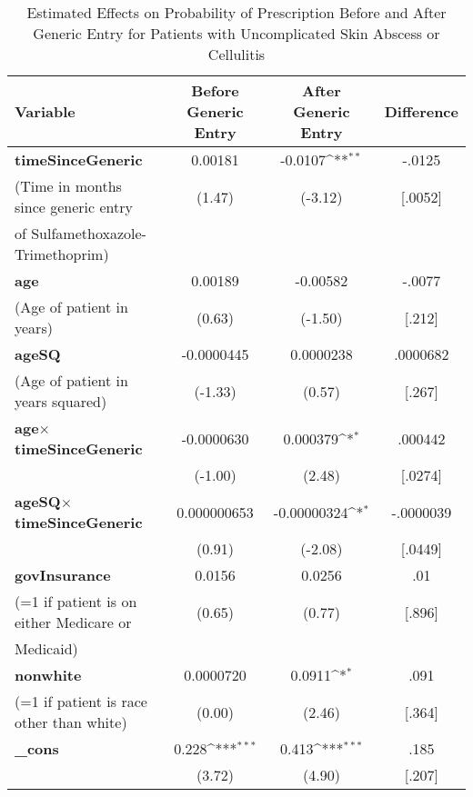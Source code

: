 \begin{table}[htbp]\centering
\def\sym#1{\ifmmode^{#1}\else\(^{#1}\)\fi}
\caption{Estimated Effects on Probability of Prescription Before and After Generic Entry for Patients with Uncomplicated Skin Abscess or Cellulitis\label{tab1}}
\begin{tabular}{l*{3}{c}}
\hline\hline
Variable            &\multicolumn{1}{c}{Before Generic Entry}&\multicolumn{1}{c}{After Generic Entry}&\multicolumn{1}{c}{Difference}\\
\hline
\textbf{timeSinceGeneric}&     0.00181         &     -0.0107\sym{**} & -.0125\\
(Time in months since generic entry            &      (1.47)         &     (-3.12) & [.0052]\\
of Sulfamethoxazole-Trimethoprim)\\
[1em]
\textbf{age}         &     0.00189         &    -0.00582 & -.0077\\
(Age of patient in years)            &      (0.63)         &     (-1.50) & [.212]\\
[1em]
\textbf{ageSQ}       &  -0.0000445         &   0.0000238 & .0000682\\
(Age of patient in years squared)            &     (-1.33)         &      (0.57) & [.267]\\
[1em]
\textbf{age}$\times$\textbf{timeSinceGeneric}      &  -0.0000630         &    0.000379\sym{*}& .000442 \\
            &     (-1.00)         &      (2.48)         & [.0274]\\
[1em]
\textbf{ageSQ}$\times$\textbf{timeSinceGeneric}    & 0.000000653         & -0.00000324\sym{*}  & -.0000039\\
            &      (0.91)         &     (-2.08)         & [.0449]\\
[1em]
\textbf{govInsurance}&      0.0156         &      0.0256         & .01\\
(=1 if patient is on either Medicare or            &      (0.65)         &      (0.77)         & [.896]\\
Medicaid)\\
[1em]
\textbf{nonwhite}    &   0.0000720         &      0.0911\sym{*}  & .091\\
(=1 if patient is race other than white)            &      (0.00)         &      (2.46)         & [.364]\\
[1em]
\textbf{\_cons}      &       0.228\sym{***}&       0.413\sym{***} & .185\\
            &      (3.72)         &      (4.90)         & [.207] \\

\end{tabular}
\end{table}
